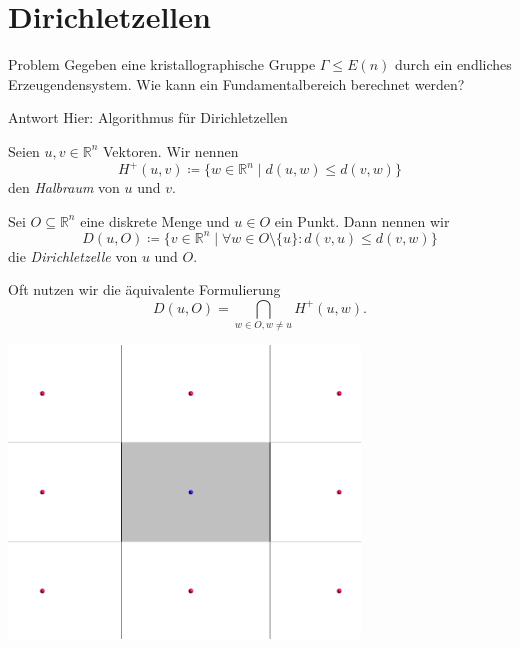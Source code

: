 \documentclass{beamer}
\theoremstyle{plain}
\newcommand\R{\mathbb R}
\begin{document}
\section{Dirichletzellen}
\begin{frame}
    \begin{alertblock}{Problem}
        Gegeben eine kristallographische Gruppe $\Gamma \leq E(n)$ durch ein endliches Erzeugendensystem. Wie kann ein Fundamentalbereich berechnet werden?
    \end{alertblock}
    \pause
    \begin{exampleblock}{Antwort}
        Hier: Algorithmus für Dirichletzellen
    \end{exampleblock}
\end{frame}

\begin{frame}
    \begin{definition}
        Seien $u, v \in \R^n$ Vektoren. Wir nennen
        $$
            H^+(u, v) \coloneqq \{ w \in \R^n \mid d(u,w) \leq d(v, w) \}
        $$
        den \emph{Halbraum} von $u$ und $v$.
    \end{definition}
    \pause
    \begin{definition}
        Sei $O \subseteq \R^n$ eine diskrete Menge und $u \in O$ ein Punkt.
        Dann nennen wir 
        $$
		    D(u, O) \coloneqq \{ v \in \R^n \mid \forall w \in O \setminus \{ u \} : d(v, u) \leq d(v, w) \}
	    $$
        die \emph{Dirichletzelle} von $u$ und $O$.
    \end{definition} \pause
    Oft nutzen wir die äquivalente Formulierung
    $$
		D(u, O) = \bigcap_{w \in O, w \neq u} H^+(u, w).
	$$
\end{frame}

\begin{frame}
    \centering
    \includegraphics[width=0.7\textwidth]{images/dirichlet-example.png}
\end{frame}
\end{document}
